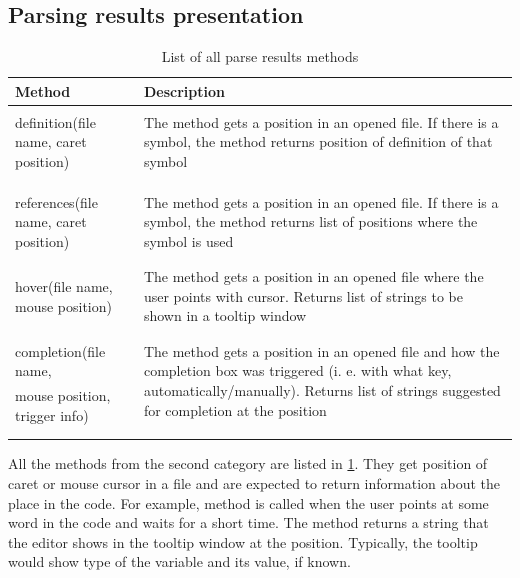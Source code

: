 \subsection{Parsing results presentation}

\begin{table}
	\centering
	\begin{tabular}{ll}
		
		\toprule
		Method & Description \\ \midrule
		& \multirow{3}{8cm}{The method gets a position in an opened file. If there is a symbol, the method returns position of definition of that symbol} \\
		definition(file name, caret position) &  \\
		& \\
		& \\
		& \multirow{3}{8cm}{The method gets a position in an opened file. If there is a symbol, the method returns list of positions where the symbol is used}\\
		references(file name, caret position) & \\
		& \\
		& \\
		& \multirow{3}{8cm}{The method gets a position in an opened file where the user points with cursor. Returns list of strings to be shown in a tooltip window}\\
		hover(file name, mouse position)& \\
		& \\
		& \\
		& \multirow{3}{8cm}{The method gets a position in an opened file and how the completion box was triggered (i. e. with what key, automatically/manually). Returns list of strings suggested for completion at the position}\\
		completion(file name,& \\
		mouse position, trigger info)& \\
		& \\
		& \\ \bottomrule
	\end{tabular}
	
	\caption{List of all parse results methods}
	\label{parse_results}
\end{table}

All the methods from the second category are listed in \cref{parse_results}. They get position of caret or mouse cursor in a file and are expected to return information about the place in the code. For example, method  is called when the user points at some word in the code and waits for a short time. The method returns a string that the editor shows in the tooltip window at the position. Typically, the tooltip would show type of the variable and its value, if known.

